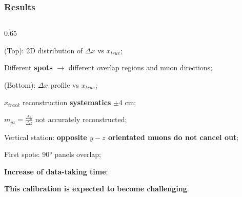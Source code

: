 \documentclass{beamer}
\begin{document}
\begin{frame}
    \frametitle{Results}

    \begin{columns}
\begin{column}{0.65\framewidth}
\vspace{-8mm}
   \setlength{\leftmargini}{1.2em}
      \begin{itemize}
 {\small
    \item (Top): 2D distribution of $\Delta x$ vs $x_{true}$;
    \vspace{1.6mm}
    \item Different \textbf{spots} $\rightarrow$ different overlap regions and muon directions;
    \vspace{1.6mm}
    \item (Bottom): $\Delta x$ profile vs $x_{true}$;
    \vspace{1.6mm}
    \item $x_{track}$ reconstruction \textbf{systematics} $\pm$4 cm;\vspace{1.6mm}
    \item $m_{yz}=\frac{\Delta y}{\Delta z}$ not accurately reconstructed;
    \vspace{1.6mm}
    \item Vertical station: \textbf{opposite $y-z$ orientated muons do not cancel out};
    \vspace{1.6mm}
        \item First spots: 90° panels overlap;
        \vspace{1.6mm}
    \item \textbf{Increase of data-taking time};
    \vspace{1.6mm}
\item \textbf{This calibration is expected to become challenging}. 
}


\end{itemize}
\end{column}
\end{columns}
\end{frame}
\end{document}

